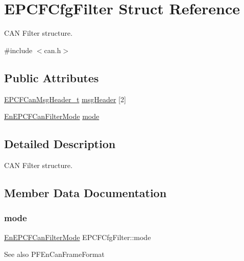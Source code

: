 \hypertarget{structEPCFCfgFilter}{}\section{E\+P\+C\+F\+Cfg\+Filter Struct Reference}
\label{structEPCFCfgFilter}


C\+AN Filter structure.  




{\ttfamily \#include $<$can.\+h$>$}

\subsection*{Public Attributes}
\begin{DoxyCompactItemize}
\item 
\mbox{\hyperlink{structEPCFCanMsgHeader__t}{E\+P\+C\+F\+Can\+Msg\+Header\+\_\+t}} \mbox{\hyperlink{structEPCFCfgFilter_a2d258b7cbf3cddb1485fbf21c67df392}{msg\+Header}} \mbox{[}2\mbox{]}
\item 
\mbox{\hyperlink{can_8h_a97f16d03af59a0449d377236677bef41}{En\+E\+P\+C\+F\+Can\+Filter\+Mode}} \mbox{\hyperlink{structEPCFCfgFilter_a4ca4c374d7444f742c40723021e52645}{mode}}
\end{DoxyCompactItemize}


\subsection{Detailed Description}
C\+AN Filter structure. 

\subsection{Member Data Documentation}
\mbox{\label{structEPCFCfgFilter_a4ca4c374d7444f742c40723021e52645}} 
\subsubsection{\texorpdfstring{mode}{mode}}
{\footnotesize\ttfamily \mbox{\hyperlink{can_8h_a97f16d03af59a0449d377236677bef41}{En\+E\+P\+C\+F\+Can\+Filter\+Mode}} E\+P\+C\+F\+Cfg\+Filter\+::mode}

\begin{DoxySeeAlso}{See also}
P\+F\+En\+Can\+Frame\+Format 
\end{DoxySeeAlso}
\mbox{\label{structEPCFCfgFilter_a2d258b7cbf3cddb1485fbf21c67df392}} 
